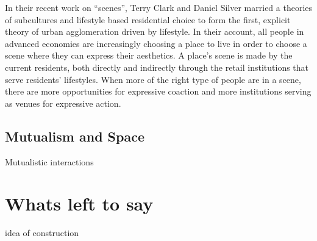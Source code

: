 In their recent work on ``scenes'', Terry Clark and Daniel Silver
married a theories of subcultures and lifestyle based residential
choice to form the first, explicit theory of urban agglomeration
driven by lifestyle. In their account, all people in advanced
economies are increasingly choosing a place to live in order to choose
a scene where they can express their aesthetics. A place's scene is
made by the current residents, both directly and indirectly through
the retail institutions that serve residents' lifestyles. When more of the
right type of people are in a scene, there are more opportunities for
expressive coaction and more institutions serving as venues for
expressive action.

\subsection*{Mutualism and Space}
Mutualistic interactions 





\section*{Whats left to say}



\stiglitz idea of construction


